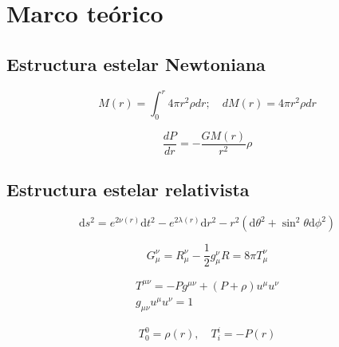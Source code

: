 \chapter{Marco teórico}

\section{Estructura estelar Newtoniana}

\begin{equation}
    M ( r ) = \int _ { 0 } ^ { r } 4 \pi r ^ { 2 } \rho d r ; \quad d M ( r ) = 4 \pi r ^ { 2 } \rho d r
\end{equation}

\begin{equation}
    \frac { d P } { d r } = - \frac { G M ( r ) } { r ^ { 2 } } \rho
\end{equation}

\section{Estructura estelar relativista}

\begin{equation}
\mathrm { d } s ^ { 2 } = e ^ { 2 \nu ( r ) } \mathrm { d } t ^ { 2 } - e ^ { 2 \lambda ( r ) } \mathrm { d } r ^ { 2 } - r ^ { 2 } \left( \mathrm { d } \theta ^ { 2 } + \sin ^ { 2 }  \theta  \mathrm { d } \phi ^ { 2 } \right)    
\end{equation}

\begin{equation}
    G _ { \mu } ^ { \nu } = R _ { \mu } ^ { \nu } - \frac { 1 } { 2 } g _ { \mu } ^ { \nu } R = 8 \pi T _ { \mu } ^ { \nu }
\end{equation}

\begin{equation}
    \begin{array} { c } { T ^ { \mu \nu } = - P g ^ { \mu \nu } + ( P + \rho ) u ^ { \mu } u ^ { \nu } } \\ { g _ { \mu \nu } u ^ { \mu } u ^ { \nu } = 1 } \end{array}
\end{equation}

\begin{equation}
    T _ { 0 } ^ { 0 } = \rho(r) , \quad T _ { i } ^ { i } = - P(r)
\end{equation}

